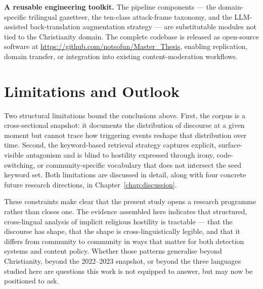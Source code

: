 \documentclass[../CLthesis.tex]{subfiles}
\begin{document}
\textbf{A reusable engineering toolkit.} The pipeline components --- the domain-specific trilingual gazetteer, the ten-class attack-frame taxonomy, and the LLM-assisted back-translation augmentation strategy --- are substitutable modules not tied to the Christianity domain. The complete codebase is released as open-source software at \url{https://github.com/notsofun/Master_Thesis}, enabling replication, domain transfer, or integration into existing content-moderation workflows.

\section{Limitations and Outlook}
\label{sec:conclusion-outlook}

Two structural limitations bound the conclusions above. First, the corpus is a cross-sectional snapshot: it documents the distribution of discourse at a given moment but cannot trace how triggering events reshape that distribution over time. Second, the keyword-based retrieval strategy captures explicit, surface-visible antagonism and is blind to hostility expressed through irony, code-switching, or community-specific vocabulary that does not intersect the seed keyword set. Both limitations are discussed in detail, along with four concrete future research directions, in Chapter~\ref{chap:discussion}.

These constraints make clear that the present study opens a research programme rather than closes one. The evidence assembled here indicates that structured, cross-lingual analysis of implicit religious hostility is tractable --- that the discourse has shape, that the shape is cross-linguistically legible, and that it differs from community to community in ways that matter for both detection systems and content policy. Whether those patterns generalise beyond Christianity, beyond the 2022--2023 snapshot, or beyond the three languages studied here are questions this work is not equipped to answer, but may now be positioned to ask.

\subfilebibliography
\end{document}
